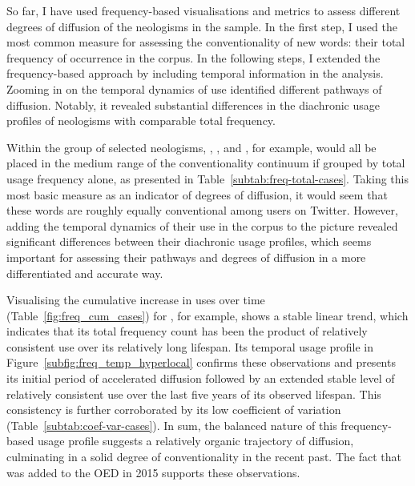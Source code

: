 \documentclass[
  a4paper,
  abstract=on,
  captions=tableabove
  ]{scrartcl}
\begin{document}
      
        So far, I have used frequency-based visualisations and metrics to assess different degrees of diffusion of the neologisms in the sample. In the first step, I used the most common measure for assessing the conventionality of new words: their total frequency of occurrence in the corpus. In the following steps, I extended the frequency-based approach by including temporal information in the analysis. Zooming in on the temporal dynamics of use identified different pathways of diffusion. Notably, it revealed substantial differences in the diachronic usage profiles of neologisms with comparable total frequency.

        Within the group of selected neologisms, , , and , for example, would all be placed in the medium range of the conventionality continuum if grouped by total usage frequency alone, as presented in Table~\ref{subtab:freq-total-cases}. Taking this most basic measure as an indicator of degrees of diffusion, it would seem that these words are roughly equally conventional among users on Twitter. However, adding the temporal dynamics of their use in the corpus to the picture revealed significant differences between their diachronic usage profiles, which seems important for assessing their pathways and degrees of diffusion in a more differentiated and accurate way.

        Visualising the cumulative increase in uses over time (Table~\ref{fig:freq_cum_cases}) for , for example, shows a stable linear trend, which indicates that its total frequency count has been the product of relatively consistent use over its relatively long lifespan. Its temporal usage profile in Figure~\ref{subfig:freq_temp_hyperlocal} confirms these observations and presents its initial period of accelerated diffusion followed by an extended stable level of relatively consistent use over the last five years of its observed lifespan. This consistency is further corroborated by its low coefficient of variation (Table~\ref{subtab:coef-var-cases}). In sum, the balanced nature of this frequency-based usage profile suggests a relatively organic trajectory of diffusion, culminating in a solid degree of conventionality in the recent past. The fact that  was added to the OED in 2015 supports these observations. 
\end{document}
